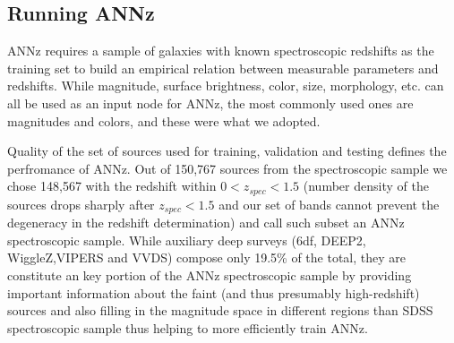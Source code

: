 \documentclass[apj,iop]{emulateapj}
\begin{document}


\subsection{Running ANNz}

ANNz requires a sample of galaxies with known spectroscopic redshifts as the training set to build an empirical relation between measurable parameters and redshifts. While magnitude, surface brightness, color, size, morphology, etc. can all be used as an input node for ANNz, the most commonly used ones are magnitudes and colors, and these were what we adopted. 


Quality of the set of sources used for training, validation and testing defines the perfromance of ANNz. Out of 150,767 sources from the spectroscopic sample we chose 148,567 with the redshift within $0 < z_{spec} < 1.5$ (number density of the sources drops sharply after $z_{spec} < 1.5$ and our set of bands cannot prevent the degeneracy in the redshift determination) and call such subset an ANNz spectroscopic sample. While auxiliary deep surveys (6df, DEEP2, WiggleZ,VIPERS and VVDS) compose only 19.5\% of the total, they are constitute an key portion of the ANNz spectroscopic sample by providing important information about the faint (and thus presumably high-redshift) sources and also filling in the magnitude space in different regions than SDSS spectroscopic sample thus helping to more efficiently train ANNz.
\end{document}
